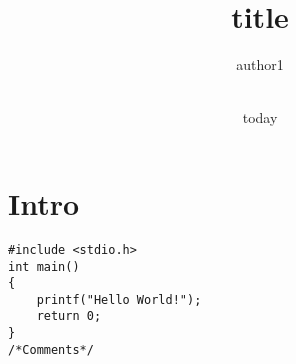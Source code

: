 \documentclass[11pt, letterpaper]{article}
\author{author1}
\date{\\today}
\title{title}
\begin{document}
\maketitle
\newpage
\tableofcontents
\newpage
\section{Intro}
\begin{lstlisting}
#include <stdio.h>
int main()
{
    printf("Hello World!");
    return 0;
}
/*Comments*/
\end{lstlisting}
%
\end{document}
